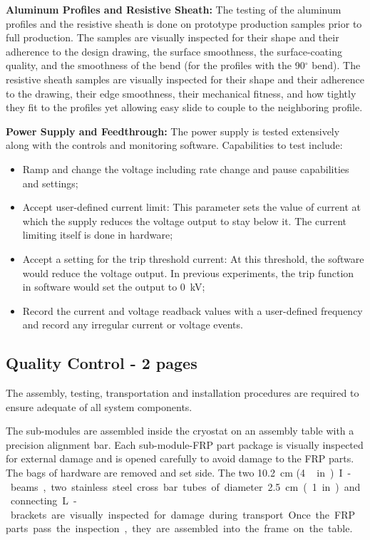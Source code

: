 {\bf Aluminum Profiles and Resistive Sheath:}
The  testing of the aluminum profiles and the resistive sheath is done on prototype production samples prior to full production.   The samples are visually inspected for their shape and their adherence to the design drawing, the surface smoothness, the surface-coating quality, and the smoothness of the bend (for the profiles with the \num{90}$^{\circ}$ bend).  The resistive sheath samples are visually inspected for their shape and their adherence to the drawing, their edge smoothness, their mechanical fitness, and how tightly they fit to the profiles yet allowing easy slide to couple to the neighboring profile.

{\bf Power Supply and Feedthrough:} The power supply is tested extensively along with the controls and monitoring software.  %
Capabilities to test include:
\begin{itemize}
\item Ramp and change the voltage including rate change and pause capabilities and settings; 
\item Accept user-defined current limit:  This parameter sets the value of current at which the supply reduces the voltage output to stay below it.  The current limiting itself is done in hardware;
\item Accept a setting for the trip threshold current:  At this threshold, the software would reduce the voltage output. 
In previous experiments, the trip function in software would set the output to \SI{0}{kV}; 
\item Record the current and voltage readback values with a user-defined frequency and record any irregular current or voltage events. 
\end{itemize}


\subsection{Quality Control - 2 pages}
\label{sec:fddp-hv-transport-QC}
The assembly, testing, transportation and installation procedures are required to ensure adequate  of all  system components.%

The  sub-modules are assembled inside the cryostat on an assembly table with a precision alignment bar.%
Each sub-module-FRP part package is visually inspected for external damage and is opened carefully to avoid damage to the FRP parts.  
The bags of hardware are removed and set side.   The two \SI{10.2}{\cm} (\SI{4}\,in) I-beams, two stainless steel cross bar tubes of diameter \SI{2.5}{cm} (\SI{1}{in}) and connecting L-brackets are visually inspected for  damage during transport.  Once the FRP parts pass the inspection, they are assembled into the frame on the table.  

